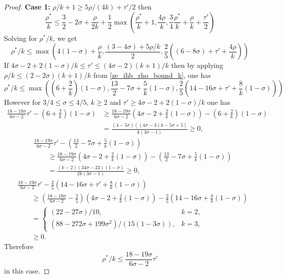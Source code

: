 \begin{proof}
\textbf{Case 1:} $\rho/k + 1 \ge 5\rho/(4k) + \tau'/2$ then 
\[
\frac{\rho^*}{k} \le \frac{3}{2} - 2\sigma + \frac{\rho}{2k} + \frac{1}{2}\max(\frac{\rho^*}{k}+1, \frac{4\rho}{k}, \frac{3}{4}\frac{\rho^*}{k} +\frac{\rho}{k}+\frac{\tau'}{2})
\]
Solving for $\rho^*/k$, we get 
\[
\rho^*/k \le \max(4(1 - \sigma) + \frac{\rho}{k}, \frac{(3 - 4\sigma) + 5\rho/k}{2}, \frac{2}{5}((6 - 8\sigma) + \tau' + \frac{4\rho}{k}))
\]
If $4\sigma - 2 + 2(1 - \sigma)/k \le \tau' \le (4\sigma - 2)(k + 1)/k$ then by applying $\rho/k \le (2 - 2\sigma)(k + 1)/k$ from \eqref{ze_ihb_rho_bound_k}, one has
\[
\rho^*/k \le \max((6 + \frac{2}{k})(1 - \sigma), \frac{13}{2} - 7\sigma + \frac{5}{k} (1 - \sigma), \frac{2}{5}(14 - 16\sigma + \tau' + \frac{8}{k}(1 - \sigma)))
\]
However for $3/4 \le \sigma \le 4/5$, $k \ge 2$ and $\tau' \ge 4\sigma - 2 + 2(1 - \sigma)/k$ one has  
\begin{align*}
\frac{18 - 19\sigma}{6\sigma - 2}\tau' - (6 + \frac{2}{k})(1 - \sigma) &\ge \frac{18 - 19\sigma}{6\sigma - 2}(4\sigma - 2 + \frac{2}{k}(1 - \sigma)) - (6 + \frac{2}{k})(1 - \sigma) \\
&= \frac{(4 - 5\sigma) ((4\sigma - 3)k - 5\sigma + 5)}{k(3\sigma - 1)} \ge 0,
\end{align*}
\begin{align*}
&\frac{18 - 19\sigma}{6\sigma - 2}\tau' - \left(\frac{13}{2} - 7\sigma + \frac{5}{k} (1 - \sigma)\right) \\
&\qquad\ge \frac{18 - 19\sigma}{6\sigma - 2}(4\sigma - 2 + \frac{2}{k}(1 - \sigma)) - \left(\frac{13}{2} - 7\sigma + \frac{5}{k} (1 - \sigma)\right) \\
&\qquad= \frac{(k - 2) (34\sigma - 23) (1 - \sigma)}{2 k (3\sigma - 1)} \ge 0,
\end{align*}
\begin{align*}
&\frac{18 - 19\sigma}{6\sigma - 2}\tau' - \frac{2}{5}(14 - 16\sigma + \tau' + \frac{8}{k}(1 - \sigma)) \\
&\qquad\ge \left(\frac{18 - 19\sigma}{6\sigma - 2} - \frac{2}{5}\right)(4\sigma - 2 + \frac{2}{k}(1 - \sigma)) - \frac{2}{5}(14 - 16\sigma + \frac{8}{k}(1 - \sigma))\\
&\qquad= \begin{cases}
(22 - 27\sigma)/10,&k = 2,\\
(88 - 272\sigma + 199\sigma^2)/(15(1 - 3\sigma)),&k=3,
\end{cases}\\
&\qquad\ge 0. 
\end{align*}
Therefore 
\begin{equation}\label{ze_ihb_rhok_targetbound}
\rho^*/k \le \frac{18 - 19\sigma}{6\sigma - 2}\tau'
\end{equation}
in this case. 


\end{proof}
